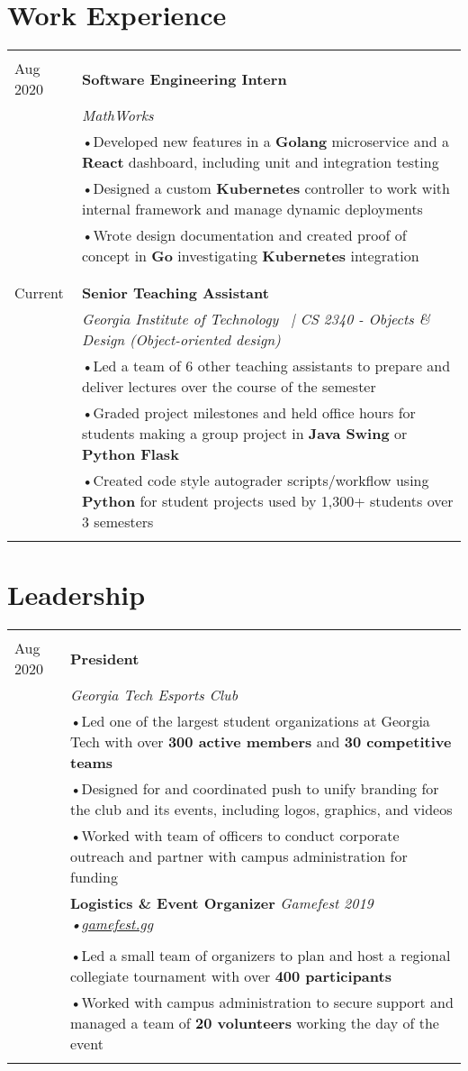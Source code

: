 \documentclass[a4paper,11pt]{article}
\newcommand{\lcolwidth}{2.2cm}
\newcommand{\lcolwidthinner}{2.1cm}
\newcommand{\rcolwidth}{16.2cm}
\newenvironment{rsection}[1]
  {
    \section{#1}
    \begin{tabular}{>{\raggedleft\arraybackslash}p{\lcolwidth}|p{\rcolwidth}}
   } {
    \\\multicolumn{2}{c}{} \\[-10pt]
    \end{tabular}
  }
\newcommand{\rheader}[2]{
    \multirow[t]{2}{*}{
        \begin{minipage}[t]{\lcolwidthinner}
            \begin{flushright}
                \textsc{#1}
            \end{flushright}
        \end{minipage}
    } & \textbf{#2}
}
\newcommand{\rdesc}[1]{
  \\[-2pt]&\small{\emph{#1}\vspace{1pt} }
}
\newcommand{\ritem}[2][ •\hspace{3pt}]{\\[-2pt]& \footnotesize{#1#2}}
\newcommand{\rsubheader}[2]{\\[1pt]& \footnotesize{\textbf{#1} \textit{#2}}\\[-12pt]}
\newcommand{\rsubitem}[1]{\ritem[\hspace{6pt}•\hspace{4pt}]{#1}}
\newcommand{\rskip}{\\\multicolumn{2}{c}{} \\[-5pt]}
\newcommand{\rdot}{\xspace\hspace{0pt}•\hspace{3pt}\xspace}
\begin{document}
\begin{rsection}{Work Experience}
  \rheader{May 2020 -\\[-1pt] Aug 2020}{Software Engineering Intern}
  \rdesc{MathWorks}
  \ritem{Developed new features in a \textbf{Golang} microservice
    and a \textbf{React} dashboard, including unit and integration testing}
  \ritem{Designed a custom \textbf{Kubernetes} controller
    to work with internal framework and manage dynamic deployments}
  \ritem{Wrote design documentation and created proof of concept
    in \textbf{Go} investigating \textbf{Kubernetes} integration}
  \rskip

  \rheader{Aug 2019 -\\[-1pt] Current}{Senior Teaching Assistant}
  \rdesc{Georgia Institute of Technology \ {\normalfont |}\hspace{2pt}
    CS 2340 - Objects \& Design (Object-oriented design)}
  \ritem{Led a team of 6 other teaching assistants to prepare and deliver lectures
    over the course of the semester}
  \ritem{Graded project milestones and held office hours for students
    making a group project in \textbf{Java Swing} or \textbf{Python Flask}}
  \ritem{Created code style autograder scripts/workflow using \textbf{Python}
    for student projects used by 1,300+ students over 3 semesters}
\end{rsection}
\vspace{-3pt}


\begin{rsection}{Leadership}
  \rheader{July 2019 -\\[-1pt] Aug 2020}{President}
  \rdesc{Georgia Tech Esports Club}
  \ritem{Led one of the largest student organizations at Georgia Tech
    with over \textbf{300 active members} and \textbf{30 competitive teams}}
  \ritem{Designed for and coordinated push to unify branding
    for the club and its events, including logos, graphics, and videos}
  \ritem{Worked with team of officers to conduct corporate outreach and partner
    with campus administration for funding}
  \rsubheader{Logistics \& Event Organizer}{
    Gamefest 2019 {\normalfont\rdot \href{https://gamefest.gg/}{gamefest.gg}}}
  \rsubitem{Led a small team of organizers to plan and host
    a regional collegiate tournament with over \textbf{400 participants}}
  \rsubitem{Worked with campus administration to secure support and managed
    a team of \textbf{20 volunteers} working the day of the event}
\end{rsection}
\vspace{-3pt}
\end{document}
